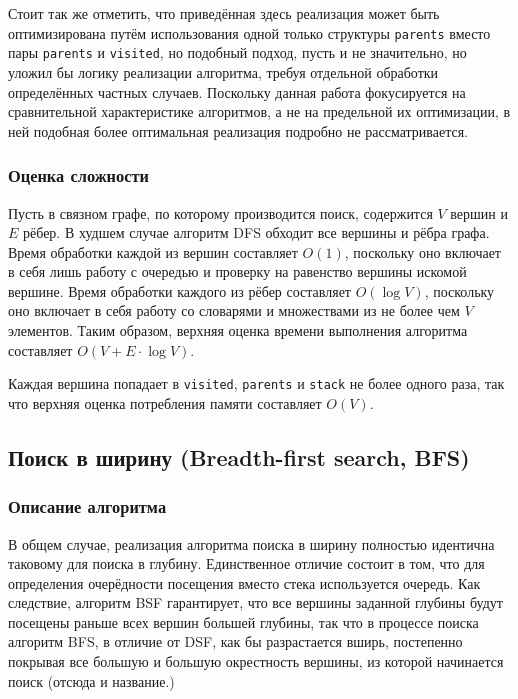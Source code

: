 \documentclass[a4paper, 12pt]{article}
\begin{document}
Стоит так же отметить, что приведённая здесь реализация может быть оптимизирована путём использования одной только структуры \verb|parents| вместо пары \verb|parents| и \verb|visited|, но подобный подход, пусть и не значительно, но уложил бы логику реализации алгоритма, требуя отдельной обработки определённых частных случаев. Поскольку данная работа фокусируется на сравнительной характеристике алгоритмов, а не на предельной их оптимизации, в ней подобная более оптимальная реализация подробно не рассматривается.

\subsubsection{Оценка сложности}
\label{ssub:DFS_complexity}
Пусть в связном графе, по которому производится поиск, содержится \({ V }\) вершин и \({ E }\) рёбер. В худшем случае алгоритм DFS обходит все вершины и рёбра графа. Время обработки каждой из вершин составляет \({ O(1) }\), поскольку оно включает в себя лишь работу с очередью и проверку на равенство вершины искомой вершине. Время обработки каждого из рёбер составляет \({ O(\log V) }\), поскольку оно включает в себя работу со словарями и множествами из не более чем \({ V }\) элементов. Таким образом, верхняя оценка времени выполнения алгоритма составляет \({ O(V + E \cdot \log V) }\).

Каждая вершина попадает в \verb|visited|, \verb|parents| и \verb|stack| не более одного раза, так что верхняя оценка потребления памяти составляет \({ O(V) }\).

\subsection{Поиск в ширину (Breadth-first search, BFS)}
\subsubsection{Описание алгоритма}
\label{ssub:BFS_algorithm}
В общем случае, реализация алгоритма поиска в ширину полностью идентична таковому для поиска в глубину. Единственное отличие состоит в том, что для определения очерёдности посещения вместо стека используется очередь. Как следствие, алгоритм BSF гарантирует, что все  вершины заданной глубины будут посещены раньше всех вершин большей глубины, так что в процессе поиска алгоритм BFS, в отличие от DSF, как бы разрастается вширь, постепенно покрывая все большую и большую окрестность вершины, из которой начинается поиск (отсюда и название.)
\end{document}
